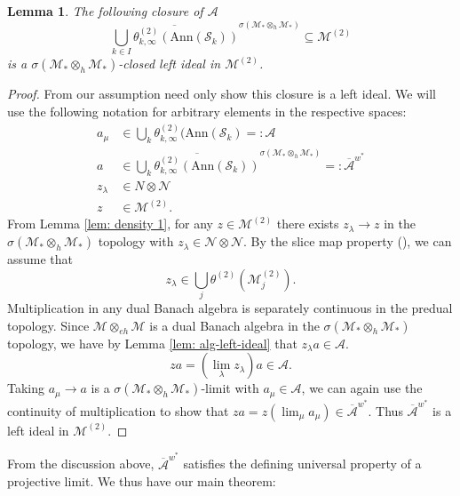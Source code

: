 \documentclass[12pt]{article}
\newtheorem{lemma}[theorem]{Lemma}
\theoremstyle{definition}
\newcommand{\mc}[1]{\mathcal{#1}}
\newcommand{\<}{\langle}
\renewcommand{\>}{\rangle}
\newcommand{\Ann}{\text{Ann}}
\newcommand{\eh}{\otimes_{eh}}
\newcommand{\h}{\otimes_{h}}
\begin{document}
\begin{lemma} \label{lemma: left ideal}
    The following closure of $\mc A$ 
    \[ 
    \overline{\bigcup_{k \in I} \theta_{k,\infty}^{(2)}(\Ann(\mc S_k))}^{\sigma(\mc M_*\otimes_{h} \mc M_*)} \subseteq \mc M^{(2)}
    \]
    is a $\sigma(\mc M_* \otimes _{h} \mc M_*)$-closed left ideal in $\mc M^{(2)}$. 
\end{lemma}
\begin{proof}
    From our assumption need only show this closure is a left ideal. We will use the following notation for arbitrary elements in the respective spaces:
    \begin{align*}
        a_\mu &\in \bigcup_k \theta_{k,\infty}^{(2)} (\Ann(\mc S_k)=: \mc A \\
        a &\in \overline{\bigcup_k \theta_{k,\infty}^{(2)} (\Ann(\mc S_k))}^{\sigma(\mc M_* \otimes_{h} \mc M_*)}=:\overline{\mc A}^{w^*} \\
        z_\lambda & \in N \otimes \mc N \\
        z & \in \mc M^{(2)}.
    \end{align*}
    From Lemma \ref{lem: density 1}, for any $z \in \mc M^{(2)}$ there exists $z_\lambda \to z$ in the $\sigma(\mc M_* \otimes_{h} \mc M_*)$ topology with $z_\lambda \in \mc N \otimes \mc N$. By the slice map property (\cite[Theorem  3.1]{blecher-smith-w*h}), we can assume that 
    \[
    z_\lambda \in \bigcup_j \theta^{(2)}(\mc M_j^{(2)}).
    \]
    Multiplication in any dual Banach algebra is separately continuous in the predual topology. Since $\mc M \eh \mc M$ is a dual Banach algebra in the $\sigma(\mc M_* \h \mc M_*)$ topology, we have by Lemma \ref{lem: alg-left-ideal} that $z_\lambda a \in \mc A$.  
    \[
    z a = (\lim_\lambda z_\lambda) a \in \mc A.
    \]
    Taking $a_\mu \to a$ is a $\sigma(\mc M_* \h \mc M_*)$-limit with $a_\mu \in \mc A$, we can again use the continuity of multiplication to show that $za = z (\lim_\mu a_\mu) \in \overline{\mc A}^{w^*}$. Thus $\overline{\mc A}^{w^*}$ is a left ideal in $\mc M^{(2)}$.
\end{proof}

From the discussion above, $\overline{\mc A}^{w^*}$ satisfies the defining universal property of a projective limit. We thus have our main theorem:
\end{document}
